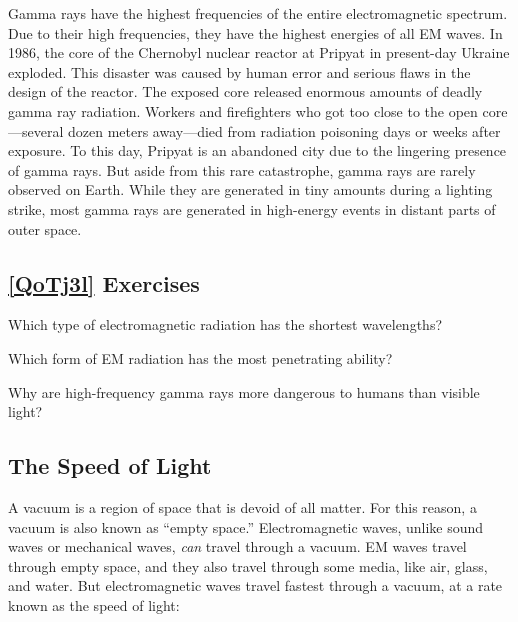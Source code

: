 \documentclass[main.tex]{subfiles}
\begin{document}
\vspace{1em}

Gamma rays have the highest frequencies of the entire electromagnetic spectrum. Due to their high frequencies, they have the highest energies of all EM waves. In 1986, the core of the Chernobyl nuclear reactor at Pripyat in present-day Ukraine exploded. This disaster was caused by human error and serious flaws in the design of the reactor. The exposed core released enormous amounts of deadly gamma ray radiation. Workers and firefighters who got too close to the open core---several dozen meters away---died from radiation poisoning days or weeks after exposure. To this day, Pripyat is an abandoned city due to the lingering presence of gamma rays. But aside from this rare catastrophe, gamma rays are rarely observed on Earth. While they are generated in tiny amounts during a lighting strike, most gamma rays are generated in high-energy events in distant parts of outer space. 

\subsection*{\ref{QoTj3l} Exercises}

\begin{exercise}
    Which type of electromagnetic radiation has the shortest wavelengths?
\end{exercise}

\begin{exercise}
    Which form of EM radiation has the most penetrating ability?
\end{exercise}

\begin{exercise}
    Why are high-frequency gamma rays more dangerous to humans than visible light?
\end{exercise}



\subsection{The Speed of Light} \label{VDAtHN}

A vacuum is a region of space that is devoid of all matter. For this reason, a vacuum is also known as ``empty space.'' Electromagnetic waves, unlike sound waves or mechanical waves, \textit{can} travel through a vacuum. EM waves travel through empty space, and they also travel through some media, like air, glass, and water. But electromagnetic waves travel fastest through a vacuum, at a rate known as the speed of light:
\end{document}
